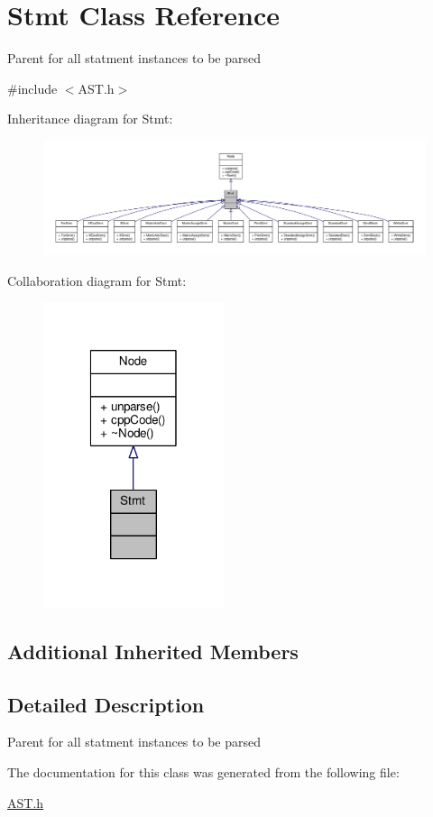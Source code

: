 \hypertarget{classStmt}{\section{Stmt Class Reference}
\label{classStmt}
}


Parent for all statment instances to be parsed \par
  




{\ttfamily \#include $<$A\-S\-T.\-h$>$}



Inheritance diagram for Stmt\-:
\nopagebreak
\begin{figure}[H]
\begin{center}
\leavevmode
\includegraphics[width=350pt]{classStmt__inherit__graph}
\end{center}
\end{figure}


Collaboration diagram for Stmt\-:\nopagebreak
\begin{figure}[H]
\begin{center}
\leavevmode
\includegraphics[width=150pt]{classStmt__coll__graph}
\end{center}
\end{figure}
\subsection*{Additional Inherited Members}


\subsection{Detailed Description}
Parent for all statment instances to be parsed \par
 

The documentation for this class was generated from the following file\-:\begin{DoxyCompactItemize}
\item 
\hyperlink{AST_8h}{A\-S\-T.\-h}\end{DoxyCompactItemize}
